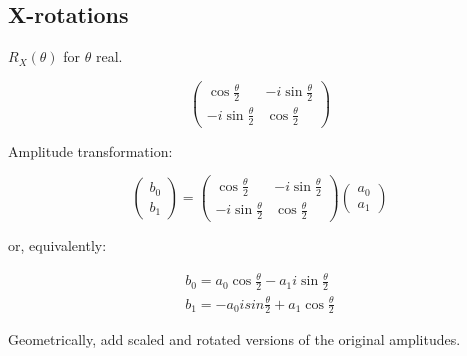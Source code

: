 \documentclass[11pt, letterpaper]{article}
\begin{document}
\subsection{X-rotations}
$R_X(\theta)$ for $\theta$ real.

\begin{equation}
	\begin{pmatrix} \cos\frac{\theta}{2} & -i\sin\frac{\theta}{2}\\  -i\sin\frac{\theta}{2} &  \cos\frac{\theta}{2} \end{pmatrix}
\end{equation}

Amplitude transformation:

\begin{equation}
	\begin{pmatrix}b_0 \\ b_1 \end{pmatrix} =
	\begin{pmatrix} \cos\frac{\theta}{2} & -i\sin\frac{\theta}{2}\\  -i\sin\frac{\theta}{2} &  \cos\frac{\theta}{2} \end{pmatrix}
	\begin{pmatrix} a_0 \\ a_1 \end{pmatrix}
\end{equation}

or, equivalently:

\begin{eqnarray*}
	b_0 = a_0\cos\frac{\theta}{2} - a_1i\sin\frac{\theta}{2} \\
	b_1 = -a_0isin\frac{\theta}{2} + a_1\cos\frac{\theta}{2}
\end{eqnarray*}


Geometrically, add scaled and rotated versions of the original amplitudes.
\end{document}

